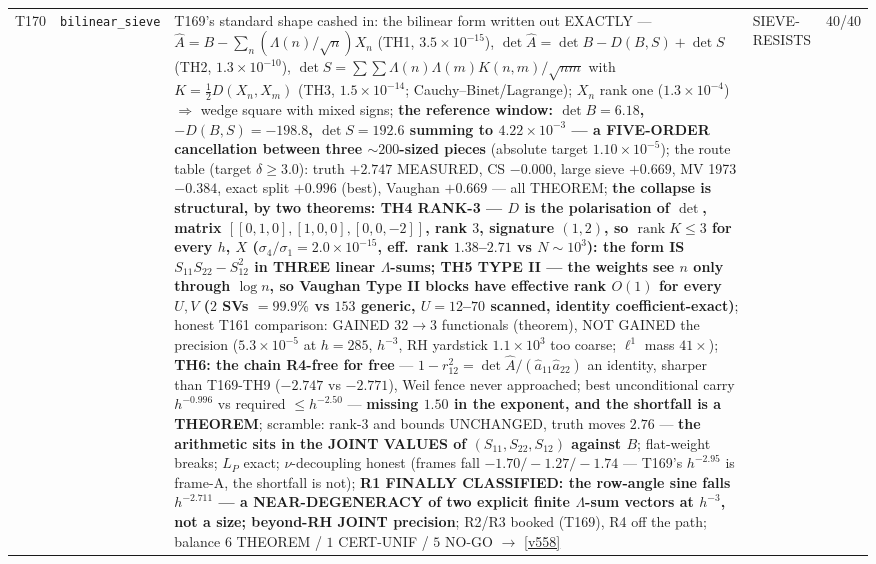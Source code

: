 \documentclass[11pt,a4paper]{article}
\begin{document}
{\begin{xltabular}{\linewidth}{@{}p{0.95cm} >{\raggedright\arraybackslash}p{3.1cm} Y >{\raggedright\scriptsize\arraybackslash}p{3.35cm} p{1.15cm}@{}}
T170 & \texttt{\scriptsize bilinear\_\allowbreak sieve} & T169's standard shape cashed in: the bilinear form written out EXACTLY --- $\hat A=B-\sum_n(\Lambda(n)/\sqrt n)X_n$ (TH1, $3.5\times10^{-15}$), $\det\hat A=\det B-D(B,S)+\det S$ (TH2, $1.3\times10^{-10}$), $\det S=\sum\sum\Lambda(n)\Lambda(m)K(n,m)/\sqrt{nm}$ with $K=\tfrac12D(X_n,X_m)$ (TH3, $1.5\times10^{-14}$; Cauchy--Binet/Lagrange); $X_n$ rank one ($1.3\times10^{-4}$) $\Rightarrow$ wedge square with mixed signs; \textbf{the reference window: $\det B=6.18$, $-D(B,S)=-198.8$, $\det S=192.6$ summing to $4.22\times10^{-3}$ --- a FIVE-ORDER cancellation between three ${\sim}200$-sized pieces} (absolute target $1.10\times10^{-5}$); the route table (target $\delta\ge3.0$): truth $+2.747$ MEASURED, CS $-0.000$, large sieve $+0.669$, MV 1973 $-0.384$, exact split $+0.996$ (best), Vaughan $+0.669$ --- all THEOREM; \textbf{the collapse is structural, by two theorems: TH4 RANK-3 --- $D$ is the polarisation of $\det$, matrix $[[0,1,0],[1,0,0],[0,0,-2]]$, rank $3$, signature $(1,2)$, so $\operatorname{rank}K\le3$ for every $h$, $X$ ($\sigma_4/\sigma_1=2.0\times10^{-15}$, eff.\ rank $1.38$--$2.71$ vs $N\sim10^3$): the form IS $S_{11}S_{22}-S_{12}^2$ in THREE linear $\Lambda$-sums; TH5 TYPE II --- the weights see $n$ only through $\log n$, so Vaughan Type II blocks have effective rank $O(1)$ for every $U,V$ ($2$ SVs $=99.9\%$ vs $153$ generic, $U=12$--$70$ scanned, identity coefficient-exact)}; honest T161 comparison: GAINED $32\to3$ functionals (theorem), NOT GAINED the precision ($5.3\times10^{-5}$ at $h=285$, $h^{-3}$, RH yardstick $1.1\times10^{3}$ too coarse; $\ell^1$ mass $41\times$); \textbf{TH6: the chain R4-free for free} --- $1-r_{12}^2=\det\hat A/(\hat a_{11}\hat a_{22})$ an identity, sharper than T169-TH9 ($-2.747$ vs $-2.771$), Weil fence never approached; best unconditional carry $h^{-0.996}$ vs required $\le h^{-2.50}$ --- \textbf{missing $1.50$ in the exponent, and the shortfall is a THEOREM}; scramble: rank-3 and bounds UNCHANGED, truth moves $2.76$ --- \textbf{the arithmetic sits in the JOINT VALUES of $(S_{11},S_{22},S_{12})$ against $B$}; flat-weight breaks; $L_P$ exact; $\nu$-decoupling honest (frames fall $-1.70/-1.27/-1.74$ --- T169's $h^{-2.95}$ is frame-A, the shortfall is not); \textbf{R1 FINALLY CLASSIFIED: the row-angle sine falls $h^{-2.711}$ --- a NEAR-DEGENERACY of two explicit finite $\Lambda$-sum vectors at $h^{-3}$, not a size; beyond-RH JOINT precision}; R2/R3 booked (T169), R4 off the path; balance $6$ THEOREM / $1$ CERT-UNIF / $5$ NO-GO $\to$ \vref{v558} & SIEVE-RESISTS & 40/40\\

\end{xltabular}}
\end{document}
